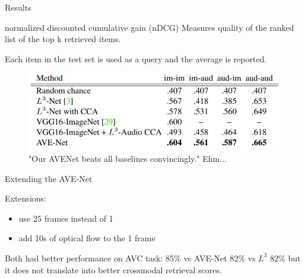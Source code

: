 \documentclass{beamer}
\begin{document}
\begin{frame}{Results}
\begin{block}{normalized discounted cumulative gain (nDCG)}
Measures quality of the ranked list of the top k retrieved items.
\end{block}

Each item in the test set is used as a query and the average  is reported.

\begin{figure}[h]
\includegraphics[width=\textwidth]{img/results}
\caption{"Our AVENet
beats all baselines convincingly." \cite{cit:ots} Ehm...}
\end{figure}

\end{frame}
\begin{frame}{Extending the AVE-Net}

Extensions:
\begin{itemize}
\item use 25 frames instead of 1
\item add 10s of optical flow to the 1 frame
\end{itemize}

\vfill

Both had better performance on AVC task: 85\% vs AVE-Net 82\% vs $L^3$ 82\% but it does not translate into better crossmodal retrieval scores.

\end{frame}
\end{document}

